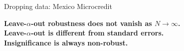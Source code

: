 \begin{frame}{Dropping data: Mexico Microcredit}

\MicrocreditMexicoGraphics{}


\textbf{Leave-$\alpha$-out robustness does not vanish as $N \rightarrow \infty$.}\\
\textbf{Leave-$\alpha$-out is different from standard errors.}\\
\textbf{Insignificance is always non-robust.}

\end{frame}
